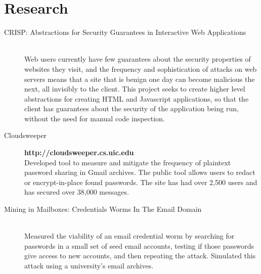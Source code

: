 \documentclass{vitae}
\begin{document}
  \section{Research}
  \begin{description}
    \item[CRISP: Abstractions for Security Guarantees in Interactive Web Applications] ~\\
    Web users currently have few guarantees about the security properties of websites they visit, and the frequency and sophistication of attacks on web servers means that a site that is benign one day can become malicious the next, all invisibly to the client.  This project seeks to create higher level abstractions for creating HTML and Javascript applications, so that the client has guarantees about the security of the application being run, without the need for manual code inspection.

    \item[Cloudsweeper] \hfill \textbf{http://cloudsweeper.cs.uic.edu}\\
    Developed tool to measure and mitigate the frequency of plaintext password sharing in Gmail archives. The public tool allows users to redact or encrypt-in-place found passwords. The site has had over 2,500 users and has secured over 38,000 messages.

    \item[Mining in Mailboxes: Credentials Worms In The Email Domain] ~\\
    Measured the viability of an email credential worm by searching for passwords in a small set of seed email accounts, testing if those passwords give access to new accounts, and then repeating the attack. Simulated this attack using a university's email archives.
  \end{description}
\end{document}
